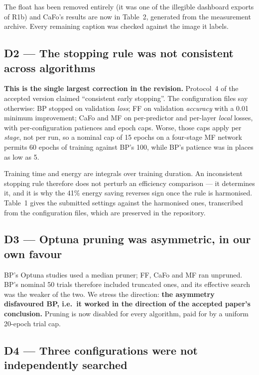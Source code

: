 \documentclass[11pt,a4paper]{article}
\newcommand{\FF}{FF}
\newcommand{\MF}{MF}
\newcommand{\BP}{BP}
\newcommand{\CaFo}{CaFo}
\begin{document}
The float has been removed entirely (it was one of the illegible dashboard
exports of R1b) and \CaFo{}'s results are now in Table~2, generated from the
measurement archive. Every remaining caption was checked against the image it
labels.

\subsection*{D2 --- The stopping rule was not consistent across algorithms}

\textbf{This is the single largest correction in the revision.} Protocol~4 of
the accepted version claimed ``consistent early stopping''. The configuration
files say otherwise: \BP{} stopped on validation \emph{loss}; \FF{} on
validation \emph{accuracy} with a \num{0.01} minimum improvement; \CaFo{} and
\MF{} on per-predictor and per-layer \emph{local} losses, with
per-configuration patiences and epoch caps. Worse, those caps apply per
\emph{stage}, not per run, so a nominal cap of \num{15} epochs on a four-stage
\MF{} network permits \num{60} epochs of training against \BP{}'s \num{100},
while \BP{}'s patience was in places as low as \num{5}.

Training time and energy are integrals over training duration. An inconsistent
stopping rule therefore does not perturb an efficiency comparison --- it
determines it, and it is why the \num{41}\% energy saving reverses sign once
the rule is harmonised. Table~1 gives the submitted settings against the
harmonised ones, transcribed from the configuration files, which are preserved
in the repository.

\subsection*{D3 --- Optuna pruning was asymmetric, in our own favour}

\BP{}'s Optuna studies used a median pruner; \FF{}, \CaFo{} and \MF{} ran
unpruned. \BP{}'s nominal \num{50} trials therefore included truncated ones,
and its effective search was the weaker of the two. We stress the direction:
\textbf{the asymmetry disfavoured \BP{}, i.e.\ it worked in the direction of
the accepted paper's conclusion.} Pruning is now disabled for every algorithm,
paid for by a uniform \num{20}-epoch trial cap.

\subsection*{D4 --- Three configurations were not independently searched}
\end{document}
